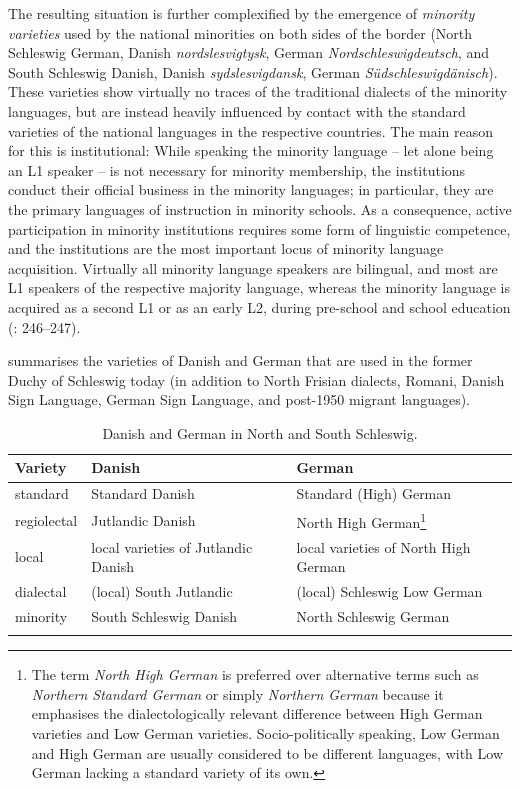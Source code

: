 \documentclass[output=paper]{langsci/langscibook}
\begin{document}
The resulting situation is further complexified by the emergence of \textit{minority varieties} used by the national minorities on both sides of the border (North Schleswig German, Danish \textit{nordslesvigtysk}, German \textit{Nordschleswigdeutsch}, and South Schleswig Danish, Danish \textit{sydslesvigdansk}, German \textit{Südschleswigdänisch}). These varieties show virtually no traces of the traditional dialects of the minority languages, but are instead heavily influenced by contact with the standard varieties of the national languages in the respective countries. The main reason for this is institutional: While speaking the minority language – let alone being an L1 speaker – is not necessary for minority membership, the institutions conduct their official business in the minority languages; in particular, they are the primary languages of instruction in minority schools. As a consequence, active participation in minority institutions requires some form of linguistic competence, and the institutions are the most important locus of minority language acquisition. Virtually all minority language speakers are bilingual, and most are L1 speakers of the respective majority language, whereas the minority language is acquired as a second L1 or as an early L2, during pre-school and school education (\citealt{Kuhl.2015}: 246–247).

 summarises the varieties of Danish and German that are used in the former Duchy of Schleswig today (in addition to North Frisian dialects, Romani, Danish Sign Language, German Sign Language, and post-1950 migrant languages).

\begin{table}
\begin{tabularx}{\textwidth}{lQQ}
\lsptoprule
Variety & Danish & German\\
\midrule
standard & Standard Danish & Standard (High) German\\
regiolectal & Jutlandic Danish & North High German\footnote{The term \textit{North High German} is preferred over alternative terms such as \textit{Northern Standard German} or simply \textit{Northern German} because it emphasises the dialectologically relevant difference between High German varieties and Low German varieties. Socio-politically speaking, Low German and High German are usually considered to be different languages, with Low German lacking a standard variety of its own.}\\
local & local varieties of Jutlandic Danish & local varieties of North High German\\
dialectal & (local) South Jutlandic & (local) Schleswig Low German\\
minority & South Schleswig Danish & North Schleswig German\\
\lspbottomrule
\end{tabularx}
\caption{Danish and German in North and South Schleswig.\label{tab:hoeder:1}}
\end{table}
\end{document}

